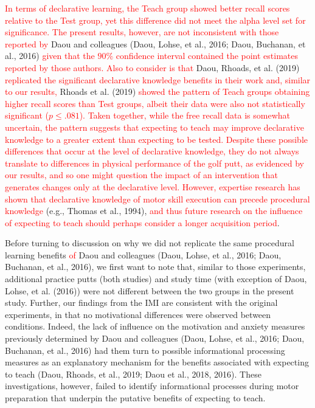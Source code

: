 \documentclass[
  english,
  man,floatsintext]{apa7}
\begin{document}
\textcolor{red}{In terms of declarative learning, the Teach group showed better recall scores relative to the Test group, yet this difference did not meet the alpha level set for significance.  The present results, however, are not inconsistent with those reported by} Daou and colleagues (Daou, Lohse, et al., 2016; Daou, Buchanan, et al., 2016) \textcolor{red}{given that the $90\%$ confidence interval contained the point estimates reported by those authors. Also to consider is that} Daou, Rhoads, et al. (2019) \textcolor{red}{replicated the significant declarative knowledge benefits in their work and, similar to our results,} Rhoads et al. (2019) \textcolor{red}{showed the pattern of Teach groups obtaining higher recall scores than Test groups, albeit their data were also not statistically significant ($p \leq .081$). Taken together, while the free recall data is somewhat uncertain, the pattern suggests that expecting to teach may improve declarative knowledge to a greater extent than expecting to be tested. Despite these possible differences that occur at the level of declarative knowledge, they do not always translate to differences in physical performance of the golf putt, as evidenced by our results, and so one might question the impact of an intervention that generates changes only at the declarative level. However, expertise research has shown that declarative knowledge of motor skill execution can precede procedural knowledge} (e.g., Thomas et al., 1994), \textcolor{red} {and thus future research on the influence of expecting to teach should perhaps consider a longer acquisition period}.

Before turning to discussion on why we did not replicate the same procedural learning benefits \textcolor{red}{of} Daou and colleagues (Daou, Lohse, et al., 2016; Daou, Buchanan, et al., 2016), we first want to note that, similar to those experiments, additional practice putts (both studies) and study time (with exception of Daou, Lohse, et al. (2016)) were not different between the two groups in the present study. Further, our findings from the IMI are consistent with the original experiments, in that no motivational differences were observed between conditions. Indeed, the lack of influence on the motivation and anxiety measures previously determined by Daou and colleagues (Daou, Lohse, et al., 2016; Daou, Buchanan, et al., 2016) had them turn to possible informational processing measures as an explanatory mechanism for the benefits associated with expecting to teach (Daou, Rhoads, et al., 2019; Daou et al., 2018, 2016). These investigations, however, failed to identify informational processes during motor preparation that underpin the putative benefits of expecting to teach.
\end{document}
